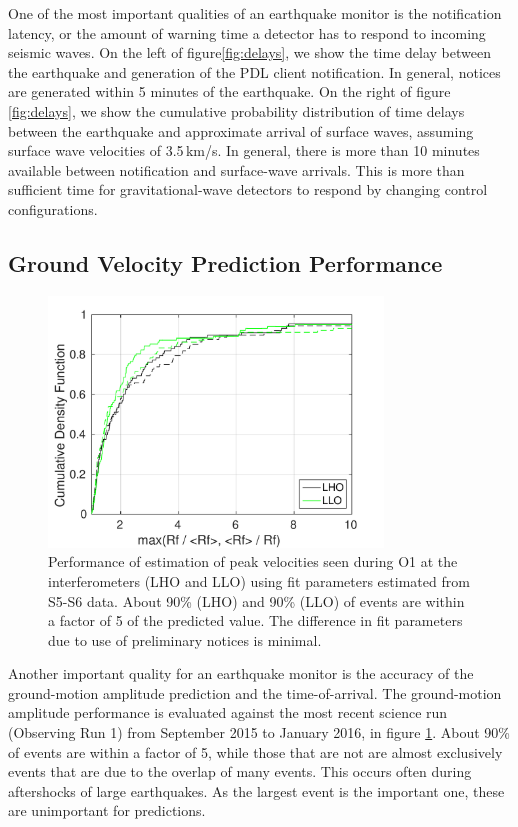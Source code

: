 \documentclass[reprint, prl, aps, showpacs]{revtex4-1}
\begin{document}
One of the most important qualities of an earthquake monitor is the notification latency, or the amount of warning time a detector has to respond to incoming seismic waves. On the left of figure\ref{fig:delays}, we show the time delay between the earthquake and generation of the PDL client notification. In general, notices are generated within 5 minutes of the earthquake. On the right of figure \ref{fig:delays}, we show the cumulative probability distribution of time delays between the earthquake and approximate arrival of surface waves, assuming surface wave velocities of 3.5\,km/s. In general, there is more than 10 minutes available between notification and surface-wave arrivals. This is more than sufficient time for gravitational-wave detectors to respond by changing control configurations.

\subsection{Ground Velocity Prediction Performance}

\begin{figure}[t]
\hspace*{-0.5cm}
 \includegraphics[width=3.5in]{initial_final_vs_real.pdf}
 \caption{Performance of estimation of peak velocities seen during O1 at the interferometers (LHO and LLO) using fit parameters estimated from S5-S6 data. About 90\% (LHO) and 90\% (LLO) of events are within a factor of 5 of the predicted value. The difference in fit parameters due to use of preliminary notices is minimal.}
 \label{fig:regressionperf}
\end{figure}

Another important quality for an earthquake monitor is the accuracy of the ground-motion amplitude prediction and the time-of-arrival.
The ground-motion amplitude performance is evaluated against the most recent science run (Observing Run 1) from September 2015 to January 2016, in figure \ref{fig:regressionperf}. About 90\% of events are within a factor of 5, while those that are not are almost exclusively events that are due to the overlap of many events. This occurs often during aftershocks of large earthquakes. As the largest event is the important one, these are unimportant for predictions. 
\end{document}
